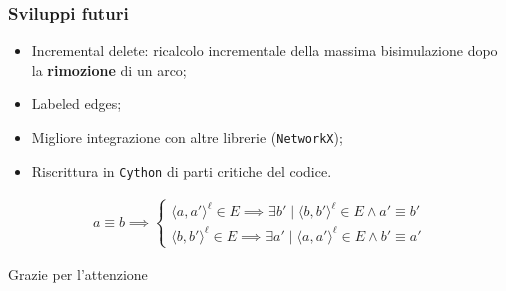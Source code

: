 \documentclass{beamer}
\begin{document}
\begin{frame}\frametitle{Sviluppi futuri}
    \begin{itemize}
        \item Incremental delete: ricalcolo incrementale della massima bisimulazione dopo la \textbf{rimozione} di un arco;
        \item Labeled edges;
        \item Migliore integrazione con altre librerie (\texttt{NetworkX});
        \item Riscrittura in \texttt{Cython} di parti critiche del codice.
    \end{itemize}

    \begin{gather*}
        a \equiv b \implies
        \begin{cases}
            \langle a, a' \rangle^\ell \in E \implies \exists b' \mid \langle b, b' \rangle^\ell \in E \land a' \equiv b'\\
            \langle b, b' \rangle^\ell \in E \implies \exists a' \mid \langle a, a' \rangle^\ell \in E \land b' \equiv a'
        \end{cases}
    \end{gather*}
\end{frame}

\begin{frame}
    Grazie per l'attenzione
\end{frame}
\end{document}
